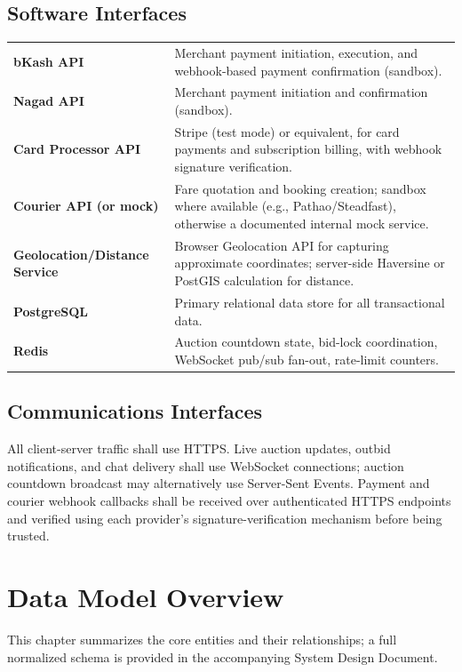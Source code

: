 \documentclass[11pt,a4paper]{report}
\newenvironment{reqtable}{\begin{longtable}{p{2.2cm}p{11.5cm}}}{\end{longtable}}
\begin{document}
\section{Software Interfaces}
\begin{reqtable}
\textbf{bKash API} & Merchant payment initiation, execution, and webhook-based payment confirmation (sandbox). \\
\textbf{Nagad API} & Merchant payment initiation and confirmation (sandbox). \\
\textbf{Card Processor API} & Stripe (test mode) or equivalent, for card payments and subscription billing, with webhook signature verification. \\
\textbf{Courier API (or mock)} & Fare quotation and booking creation; sandbox where available (e.g., Pathao/Steadfast), otherwise a documented internal mock service. \\
\textbf{Geolocation/Distance Service} & Browser Geolocation API for capturing approximate coordinates; server-side Haversine or PostGIS calculation for distance. \\
\textbf{PostgreSQL} & Primary relational data store for all transactional data. \\
\textbf{Redis} & Auction countdown state, bid-lock coordination, WebSocket pub/sub fan-out, rate-limit counters. \\
\end{reqtable}

\section{Communications Interfaces}
All client-server traffic shall use HTTPS. Live auction updates, outbid notifications, and chat delivery shall use WebSocket connections; auction countdown broadcast may alternatively use Server-Sent Events. Payment and courier webhook callbacks shall be received over authenticated HTTPS endpoints and verified using each provider's signature-verification mechanism before being trusted.

\chapter{Data Model Overview}
This chapter summarizes the core entities and their relationships; a full normalized schema is provided in the accompanying System Design Document.
\end{document}
